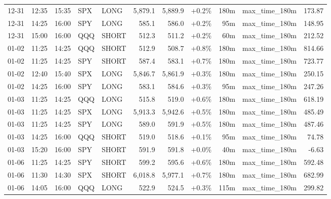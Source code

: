 \documentclass[11pt,a4paper,twoside]{article}
\begin{document}
\begin{center}
\begin{longtable}{>{\color{txtmain}}l l l l l r r r r >{\color{txtmain}}l r}
12-31 & 12:35 & 15:35 & SPX & LONG & 5,879.1 & 5,889.9 & \textcolor{wingreen}{+0.2\%} & 180m & max\_time\_180m & \textcolor{wingreen}{173.87} \\
12-31 & 14:25 & 16:00 & SPY & LONG & 585.1 & 586.0 & \textcolor{wingreen}{+0.2\%} & 95m & max\_time\_180m & \textcolor{wingreen}{148.95} \\
12-31 & 15:00 & 16:00 & QQQ & SHORT & 512.3 & 511.2 & \textcolor{wingreen}{+0.2\%} & 60m & max\_time\_180m & \textcolor{wingreen}{212.52} \\
01-02 & 11:25 & 14:25 & QQQ & SHORT & 512.9 & 508.7 & \textcolor{wingreen}{+0.8\%} & 180m & max\_time\_180m & \textcolor{wingreen}{814.66} \\
01-02 & 11:25 & 14:25 & SPY & SHORT & 587.4 & 583.1 & \textcolor{wingreen}{+0.7\%} & 180m & max\_time\_180m & \textcolor{wingreen}{723.77} \\
01-02 & 12:40 & 15:40 & SPX & LONG & 5,846.7 & 5,861.9 & \textcolor{wingreen}{+0.3\%} & 180m & max\_time\_180m & \textcolor{wingreen}{250.15} \\
01-02 & 14:25 & 16:00 & SPY & LONG & 583.1 & 584.6 & \textcolor{wingreen}{+0.3\%} & 95m & max\_time\_180m & \textcolor{wingreen}{247.26} \\
01-03 & 11:25 & 14:25 & QQQ & LONG & 515.8 & 519.0 & \textcolor{wingreen}{+0.6\%} & 180m & max\_time\_180m & \textcolor{wingreen}{618.19} \\
01-03 & 11:25 & 14:25 & SPX & LONG & 5,913.3 & 5,942.6 & \textcolor{wingreen}{+0.5\%} & 180m & max\_time\_180m & \textcolor{wingreen}{485.49} \\
01-03 & 11:25 & 14:25 & SPY & LONG & 589.0 & 591.9 & \textcolor{wingreen}{+0.5\%} & 180m & max\_time\_180m & \textcolor{wingreen}{487.46} \\
01-03 & 14:25 & 16:00 & QQQ & SHORT & 519.0 & 518.6 & \textcolor{wingreen}{+0.1\%} & 95m & max\_time\_180m & \textcolor{wingreen}{74.78} \\
01-03 & 15:20 & 16:00 & SPY & SHORT & 591.9 & 591.8 & \textcolor{wingreen}{+0.0\%} & 40m & max\_time\_180m & \textcolor{lossred}{-6.63} \\
01-06 & 11:25 & 14:25 & SPY & SHORT & 599.2 & 595.6 & \textcolor{wingreen}{+0.6\%} & 180m & max\_time\_180m & \textcolor{wingreen}{592.48} \\
01-06 & 11:30 & 14:30 & SPX & SHORT & 6,018.8 & 5,977.1 & \textcolor{wingreen}{+0.7\%} & 180m & max\_time\_180m & \textcolor{wingreen}{682.99} \\
01-06 & 14:05 & 16:00 & QQQ & LONG & 522.9 & 524.5 & \textcolor{wingreen}{+0.3\%} & 115m & max\_time\_180m & \textcolor{wingreen}{299.82} \\

\end{longtable}
\end{center}
\end{document}
